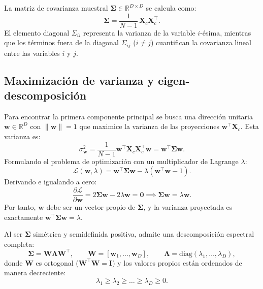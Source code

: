 \documentclass[11pt,letterpaper]{article}
\begin{document}
	La matriz de covarianza muestral $\boldsymbol{\Sigma} \in \mathbb{R}^{D\times D}$ se calcula como:
	\begin{equation}
		\boldsymbol{\Sigma} = \frac{1}{N-1}\, \mathbf{X}_c \mathbf{X}_c^{\top}.
		\label{eq:covarianza}
	\end{equation}
	El elemento diagonal $\Sigma_{ii}$ representa la varianza de la variable $i$-ésima, mientras que los términos fuera de la diagonal $\Sigma_{ij}$ ($i \neq j$) cuantifican la covarianza lineal entre las variables $i$ y $j$.
	
	\subsection{Maximización de varianza y eigen-descomposición}
	
	Para encontrar la primera componente principal se busca una dirección unitaria $\mathbf{w} \in \mathbb{R}^D$ con $\|\mathbf{w}\| = 1$ que maximice la varianza de las proyecciones $\mathbf{w}^{\top}\mathbf{X}_c$. Esta varianza es:
	\begin{equation}
		\sigma^2_{\mathbf{w}} = \frac{1}{N-1} \mathbf{w}^{\top}\mathbf{X}_c \mathbf{X}_c^{\top}\mathbf{w} = \mathbf{w}^{\top}\boldsymbol{\Sigma}\mathbf{w}.
	\end{equation}
	Formulando el problema de optimización con un multiplicador de Lagrange $\lambda$:
	\begin{equation}
		\mathcal{L}(\mathbf{w}, \lambda) = \mathbf{w}^{\top}\boldsymbol{\Sigma}\mathbf{w} - \lambda(\mathbf{w}^{\top}\mathbf{w} - 1).
	\end{equation}
	Derivando e igualando a cero:
	\begin{equation}
		\frac{\partial \mathcal{L}}{\partial \mathbf{w}} = 2\boldsymbol{\Sigma}\mathbf{w} - 2\lambda\mathbf{w} = \mathbf{0} \implies \boldsymbol{\Sigma}\mathbf{w} = \lambda\mathbf{w}.
	\end{equation}
	Por tanto, $\mathbf{w}$ debe ser un vector propio de $\boldsymbol{\Sigma}$, y la varianza proyectada es exactamente $\mathbf{w}^{\top}\boldsymbol{\Sigma}\mathbf{w} = \lambda$. 
	
	Al ser $\boldsymbol{\Sigma}$ simétrica y semidefinida positiva, admite una descomposición espectral completa:
	\begin{equation}
		\boldsymbol{\Sigma} = \mathbf{W}\boldsymbol{\Lambda}\mathbf{W}^{\top}, \qquad \mathbf{W}=[\mathbf{w}_1,\dots,\mathbf{w}_D], \qquad \boldsymbol{\Lambda}=\mathrm{diag}(\lambda_1,\dots,\lambda_D),
		\label{eq:eigen}
	\end{equation}
	donde $\mathbf{W}$ es ortogonal ($\mathbf{W}^{\top}\mathbf{W}=\mathbf{I}$) y los valores propios están ordenados de manera decreciente:
	\begin{equation}
		\lambda_1 \ge \lambda_2 \ge \dots \ge \lambda_D \ge 0.
	\end{equation}
	
\end{document}
